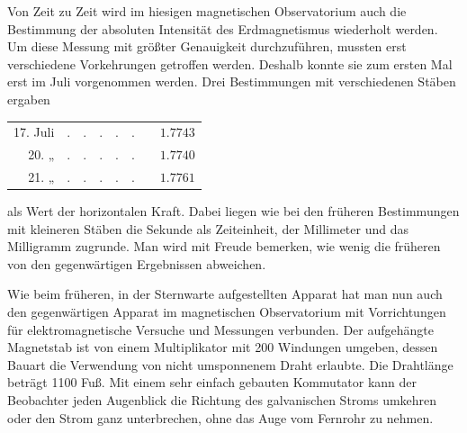 Von Zeit zu Zeit wird im hiesigen magnetischen Observatorium auch die Bestimmung der absoluten Intensität des Erdmagnetismus wiederholt werden. Um diese Messung mit größter Genauigkeit durchzuführen, mussten erst verschiedene Vorkehrungen getroffen werden. Deshalb konnte sie zum ersten Mal erst im Juli vorgenommen werden. Drei Bestimmungen mit verschiedenen Stäben ergaben
\begin{center}
\begin{tabular}{rllllllr}
17. Juli & . & . & . & . & . & & $1.7743$\\
20. \enspace „ & . & . & . & . & . & & $1.7740$\\
21. \enspace „ & . & . & . & . & . & & $1.7761$
\end{tabular}
\end{center}
als Wert der horizontalen Kraft. Dabei liegen wie bei den früheren Bestimmungen mit kleineren Stäben die Sekunde als Zeiteinheit, der Millimeter und das Milligramm zugrunde. Man wird mit Freude bemerken, wie wenig die früheren von den gegenwärtigen Ergebnissen abweichen.

Wie beim früheren, in der Sternwarte aufgestellten Apparat hat man nun auch den gegenwärtigen Apparat im magnetischen Observatorium mit Vorrichtungen für elektromagnetische Versuche und Messungen verbunden. Der aufgehängte Magnetstab ist von einem Multiplikator mit 200 Windungen umgeben, dessen Bauart die Verwendung von nicht umsponnenem Draht erlaubte. Die Drahtlänge beträgt 1100 Fuß. Mit einem sehr einfach gebauten Kommutator kann der Beobachter jeden Augenblick die Richtung des galvanischen Stroms umkehren oder den Strom ganz unterbrechen, ohne das Auge vom Fernrohr zu nehmen.

